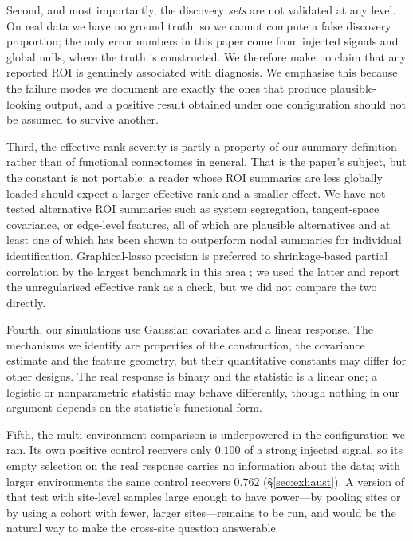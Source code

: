 \documentclass[11pt,a4paper]{article}
\begin{document}
Second, and most importantly, the discovery \emph{sets} are not validated at
any level. On real data we have no ground truth, so we cannot compute a
false discovery proportion; the only error numbers in this paper come from
injected signals and global nulls, where the truth is constructed. We
therefore make no claim that any reported ROI is genuinely associated with
diagnosis. We emphasise this because the failure modes we document are
exactly the ones that produce plausible-looking output, and a positive
result obtained under one configuration should not be assumed to survive
another.

Third, the effective-rank severity is partly a property of our summary
definition rather than of functional connectomes in general. That is the
paper's subject, but the constant is not portable: a reader whose ROI
summaries are less globally loaded should expect a larger effective rank
and a smaller effect. We have not tested alternative ROI summaries such as
system segregation, tangent-space covariance, or edge-level features, all of
which are plausible alternatives and at least one of which
\citep{faskowitz2020edge,jo2021edge} has been shown to outperform nodal
summaries for individual identification. Graphical-lasso precision is
preferred to shrinkage-based partial correlation by the largest benchmark in
this area \citep{peterson2023regularized}; we used the latter and report the
unregularised effective rank as a check, but we did not compare the two
directly.

Fourth, our simulations use Gaussian covariates and a linear response. The
mechanisms we identify are properties of the construction, the covariance
estimate and the feature geometry, but their quantitative constants may
differ for other designs. The real response is binary and the statistic is a
linear one; a logistic or nonparametric statistic may behave differently,
though nothing in our argument depends on the statistic's functional form.

Fifth, the multi-environment comparison is underpowered in the configuration
we ran. Its own positive control recovers only $0.100$ of a strong injected
signal, so its empty selection on the real response carries no information
about the data; with larger environments the same control recovers $0.762$
(\S\ref{sec:exhaust}). A version of that test with site-level samples large
enough to have power---by pooling sites or by using a cohort with fewer,
larger sites---remains to be run, and would be the natural way to make the
cross-site question answerable.
\end{document}
